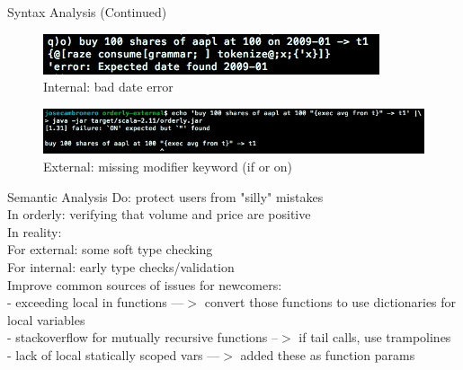 \documentclass{beamer}
\begin{document}
\begin{frame}[fragile]{Syntax Analysis (Continued)}
\begin{figure}[ht]
\centering
\includegraphics[scale=0.5]{internal-parse-error.jpeg}
\caption{Internal: bad date error}
\end{figure}
\begin{figure}[ht]
\centering
\includegraphics[scale=0.45]{external-parse-error.jpeg}
\caption{External: missing modifier keyword (if or on)}
\end{figure}
\end{frame}


\begin{frame}{Semantic Analysis}
Do: protect users from "silly" mistakes \\
In orderly: verifying that volume and price are positive \\

In reality: \\
For external: some soft type checking \\
For internal: early type checks/validation \\
Improve common sources of issues for newcomers: \\
   - exceeding local in functions ---$>$ convert those functions to use dictionaries for local variables\\
   - stackoverflow for mutually recursive functions --$>$ if tail calls, use trampolines \\
   - lack of local statically scoped vars  ---$>$ added these as function params
\end{frame}
\end{document}
